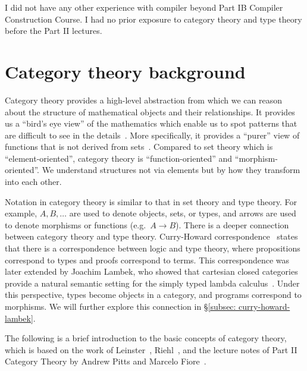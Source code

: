 \documentclass[12pt,twoside,a4paper]{report}
\theoremstyle{definition}
\theoremstyle{definition}
\newcommand{\secref}[1]{\S\ref{#1}}
\begin{document}
    I did not have any other experience with compiler beyond Part IB Compiler Construction Course. I had no prior exposure to category theory and type theory before the Part II lectures.


    \section{Category theory background} \label{sec: cat}
        Category theory provides a high-level abstraction from which we can reason about the structure of mathematical objects and their relationships. It provides us a ``bird's eye view'' of the mathematics which enable us to spot patterns that are difficult to see in the details~\cite{basic_cat}. More specifically, it provides a ``purer'' view of functions that is not derived from sets~\cite{scott-lambda}. Compared to set theory which is ``element-oriented'', category theory is ``function-oriented'' and ``morphism-oriented''. We understand structures not via elements but by how they transform into each other. 

        Notation in category theory is similar to that in set theory and type theory. For example, $A, B, \dots$ are used to denote objects, sets, or types, and arrows are used to denote morphisms or functions (e.g.\ $A \to B$). There is a deeper connection between category theory and type theory. Curry-Howard correspondence~\cite{curry-howard} states that there is a correspondence between logic and type theory, where propositions correspond to types and proofs correspond to terms. This correspondence was later extended by Joachim Lambek, who showed that cartesian closed categories provide a natural semantic setting for the simply typed lambda calculus~\cite{lambek}. Under this perspective, types become objects in a category, and programs correspond to morphisms. We will further explore this connection in \secref{subsec: curry-howard-lambek}.


        The following is a brief introduction to the basic concepts of category theory, which is based on the work of Leinster~\cite{basic_cat}, 
        Riehl~\cite{cat_context}, and the lecture notes of Part II Category Theory by Andrew Pitts and Marcelo Fiore~\cite{cat_lecture_notes}.
\end{document}
